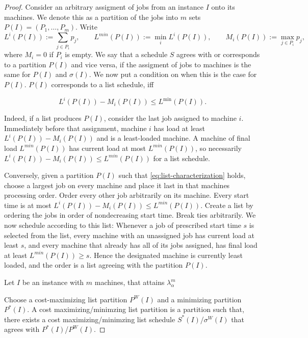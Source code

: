 \documentclass[11pt]{article}
\begin{document}
\begin{proof}
Consider an arbitrary assigment of jobs from an instance $I$ onto its machines. We denote this as a partition of the jobs into $m$
sets $P(I)=(P_1,\ldots,P_m)$.
Write
\[
    L^{i}(P(I)):=\sum_{j\in P_i}p_j,
 \qquad L^{min}(P(I)):=\min_i L^i(P(I)),
 \qquad M_i(P(I)):=\max_{j\in P_i}p_j,
\]
where $M_i=0$ if $P_i$ is empty. 
We say that a schedule $S$ agrees with or corresponds to a partition $P(I)$ and vice versa, if the assigment of jobs to machines is the same for $P(I)$ and $\sigma(I)$.
We now put a condition on when this is the case for $P(I)$.
$P(I)$ corresponds to a list schedule, iff 

\begin{equation}
    L^{i}(P(I))-M_{i}(P(I)) \le L^{\min}(P(I)).
    \label{eq:list-characterization}
\end{equation}


Indeed, if a list produces $P(I)$, consider the last job assigned to
machine $i$.  Immediately before that assignment, machine $i$ has load
at least $L^{i}(P(I))-M_i(P(I))$ and is a least-loaded machine.  A machine of final
load $L^{min}(P(I))$ has current load at most $L^{min}(P(I))$, so necessarily $L^{i}(P(I))-M_{i}(P(I)) \le L^{min}(P(I))$ for
a list schedule.

Conversely, given a partition $P(I)$ such that \ref{eq:list-characterization} holds,
choose a largest job on every machine and place it last in that
machines processing order. Order every other job arbitrarily on its
machine. 
Every start time is at most
$L^i(P(I))-M_i(P(I))\leq L^{min}(P(I))$. Create a list by ordering the jobs in order
of nondecreasing start time. Break ties arbitrarily. We now schedule according to this list: 
\newline
Whenever a job of prescribed start time $s$ is selected from the list,
every machine with an unassigned job has current load at least $s$, and
every machine that already has all of its jobs assigned, has final load at least $ L^{min}(P(I))\geq s$.  Hence the
designated machine is currently least loaded, and the order is a
list agreeing with the partition $P(I)$.

Let $I$ be an instance with $m$ machines, that attains $\lambda_{\alpha}^m$

Choose a cost-maximizing list partition $P^{W}(I)$ and a minimizing
partition $P^*(I)$. A cost maximizing/minimzing list partition is a partition such that, 
there exists a cost maximizing/minimzing list schedule $S^*(I)$/$\sigma^{W}(I)$ that agrees with $P^*(I)$/$P^{W}(I)$. 
 


\end{proof}
\end{document}

